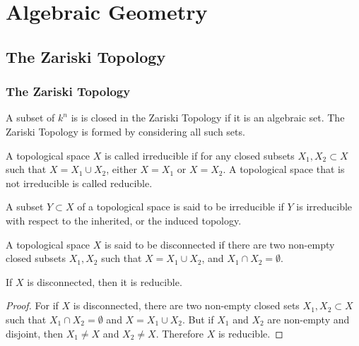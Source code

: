 \documentclass[crop=false,class=article,oneside]{standalone}
\begin{document}
    \ifx\ifsub\undefined
        \section*{Algebraic Geometry}
        \setcounter{section}{1}
    \fi
    \subsection{The Zariski Topology}
        \subsubsection{The Zariski Topology}
            \begin{definition}
                A subset of $k^{n}$ is is closed in the
                Zariski Topology if it is an algebraic set.
                The Zariski Topology is formed by
                considering all such sets.
            \end{definition}
            \begin{definition}
                A topological space $X$ is called irreducible if
                for any closed subsets $X_1,X_2\subset X$ such that
                $X=X_{1}\cup{X_{2}}$, either $X=X_{1}$ or
                $X=X_{2}$. A topological space that is
                not irreducible is called reducible.
            \end{definition}
            \begin{definition}
                A subset $Y\subset X$ of a topological space
                is said to be irreducible if $Y$ is irreducible
                with respect to the inherited,
                or the induced topology.
            \end{definition}
            \begin{definition}
                A topological space $X$ is said to be disconnected
                if there are two non-empty closed subsets $X_1,X_2$
                such that $X=X_1\cup X_2$,
                and $X_1\cap X_2 = \emptyset$.
            \end{definition}
            \begin{theorem}
                If $X$ is disconnected, then it is reducible.
            \end{theorem}
            \begin{proof}
                For if $X$ is disconnected, there are two
                non-empty closed sets $X_1,X_2\subset X$ such
                that $X_1\cap X_2 = \emptyset$ and
                $X=X_1\cup X_2$. But if $X_1$ and $X_2$
                are non-empty and disjoint, then
                $X_1\ne X$ and $X_2 \ne X$.
                Therefore $X$ is reducible.
            \end{proof}
\end{document}
